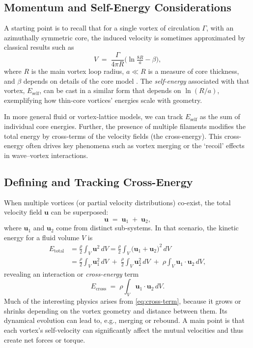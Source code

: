 \subsection{Momentum and Self-Energy Considerations}
\label{sec:momentum}
A starting point is to recall that for a single vortex of circulation $\Gamma$, with an
azimuthally symmetric core, the induced velocity is sometimes approximated by
classical results such as
\begin{equation}
   V \;=\; \frac{\Gamma}{4 \pi R}
   \bigl(\ln \tfrac{8 R}{a} - \beta \bigr),\label{eq:appendix:velocity}
\end{equation}
where $R$ is the main vortex loop radius, $a \ll R$ is a measure of core thickness,
and $\beta$ depends on details of the core model \cite{Saffman1992}. The
\emph{self-energy} associated with that vortex, $E_{\text{self}}$, can be cast in a
similar form that depends on $\ln(R/a)$, exemplifying how thin-core vortices'
energies scale with geometry.

In more general fluid or vortex-lattice models, we can track $E_{\text{self}}$ as the
sum of individual core energies. Further, the presence of multiple filaments modifies
the total energy by cross-terms of the velocity fields (the cross-energy). This
cross-energy often drives key phenomena such as vortex merging or the `recoil'
effects in wave--vortex interactions.

\subsection{Defining and Tracking Cross-Energy}
\label{sec:cross}
When multiple vortices (or partial velocity distributions) co-exist, the total velocity
field $\mathbf{u}$ can be superposed:
\begin{equation}
   \mathbf{u} \;=\; \mathbf{u}_1 \;+\;\mathbf{u}_2,\label{eq:appendix:superpose}
\end{equation}
where $\mathbf{u}_1$ and $\mathbf{u}_2$ come from distinct sub-systems. In that
scenario, the kinetic energy for a fluid volume $V$ is
\begin{align}
   E_{\text{total}} &= \frac{\rho}{2} \int_V \mathbf{u}^2 \,dV
   = \frac{\rho}{2} \int_V \bigl(\mathbf{u}_1 + \mathbf{u}_2 \bigr)^2\, dV \\
   &= \frac{\rho}{2} \int_V \mathbf{u}_1^2 \,dV \;+\;\frac{\rho}{2} \int_V \mathbf{u}_2^2 \, dV
   \;+\;\rho \int_V \mathbf{u}_1 \cdot \mathbf{u}_2 \, dV,
\end{align}
revealing an interaction or \emph{cross-energy} term
\begin{equation}
   E_{\text{cross}} \;=\; \rho \int_V \mathbf{u}_1 \cdot \mathbf{u}_2 \, dV.
   \label{eq:cross-term}
\end{equation}
Much of the interesting physics arises from \eqref{eq:cross-term}, because it
grows or shrinks depending on the vortex geometry and distance between them.
Its dynamical evolution can lead to, e.g., merging or rebound. A main point is that
each vortex's self-velocity can significantly affect the mutual velocities and thus
create net forces or torque.

